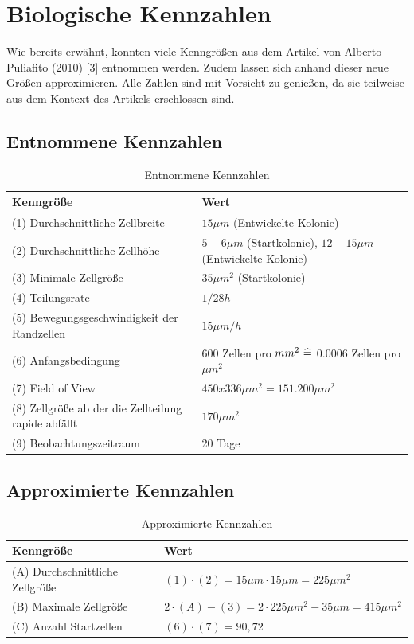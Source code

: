 \documentclass[11pt,a4paper,pointlessnumbers]{scrreprt}  %
\begin{document}
\chapter{Biologische Kennzahlen}
Wie bereits erwähnt, konnten viele Kenngrößen aus dem Artikel von Alberto Puliafito (2010) [3] entnommen werden. Zudem lassen sich anhand dieser neue Größen approximieren. Alle Zahlen sind mit Vorsicht zu genießen, da sie teilweise aus dem Kontext des Artikels erschlossen sind.  

\section{Entnommene Kennzahlen}
\begin{table}[!ht]
	\centering
	\caption{Entnommene Kennzahlen}
	\label{my-label}
	\begin{tabularx}{\textwidth}{lX}
		\toprule
		\textbf{Kenngröße} & \textbf{Wert}                                                                                          \\ \midrule
		(1) Durchschnittliche Zellbreite &	$15 \mu m$ (Entwickelte Kolonie) 
		\\
		(2) Durchschnittliche Zellhöhe & $5-6 \mu m$ (Startkolonie), $12-15 \mu m$ (Entwickelte Kolonie) 
		\\
		(3) Minimale Zellgröße & $35 \mu m ^{2}$ (Startkolonie) 
		\\
		(4) Teilungsrate & $1/28h$ 
		\\
		(5) Bewegungsgeschwindigkeit der Randzellen & $15 \mu m/h$ 
		\\
		(6) Anfangsbedingung    & 600 Zellen pro $mm^{2} \text{\space} \widehat{=} $ 0.0006 Zellen pro $\mu m^{2}$ 
		\\
		(7) Field of View & $450x336 \mu m^{2} = 151.200 \mu m^{2}$ 
		\\
		(8) Zellgröße ab der die Zellteilung rapide abfällt & $170 \mu m^{2} $
		\\
		(9) Beobachtungszeitraum & 20 Tage 
		\\ \bottomrule
	\end{tabularx}
\end{table}

\section{Approximierte Kennzahlen}
\begin{table}[!ht]
	\centering
	\caption{Approximierte Kennzahlen}
	\label{my-label}
	\begin{tabularx}{\textwidth}{lX}
		\toprule
		\textbf{Kenngröße} & \textbf{Wert}                                                                                          \\ \midrule
		(A) Durchschnittliche Zellgröße &	$(1) \cdot (2) = 15\mu m \cdot 15\mu m = 225 \mu m^{2}$ 
		\\
		(B) Maximale Zellgröße &  $2 \cdot (A) - (3) = 2 \cdot 225 \mu m^{2}-35\mu m = 415 \mu m^{2}$
		\\
		(C) Anzahl Startzellen & $(6) \cdot (7) = 90,72$
		\\ \bottomrule
	\end{tabularx}
\end{table}
\end{document}

